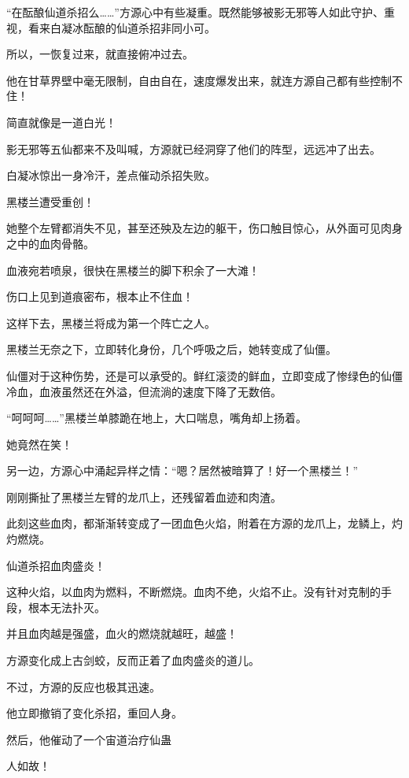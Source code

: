 \begin{this_body}
“在酝酿仙道杀招么……”方源心中有些凝重。既然能够被影无邪等人如此守护、重视，看来白凝冰酝酿的仙道杀招非同小可。

所以，一恢复过来，就直接俯冲过去。

他在甘草界壁中毫无限制，自由自在，速度爆发出来，就连方源自己都有些控制不住！

简直就像是一道白光！

影无邪等五仙都来不及叫喊，方源就已经洞穿了他们的阵型，远远冲了出去。

白凝冰惊出一身冷汗，差点催动杀招失败。

黑楼兰遭受重创！

她整个左臂都消失不见，甚至还殃及左边的躯干，伤口触目惊心，从外面可见肉身之中的血肉骨骼。

血液宛若喷泉，很快在黑楼兰的脚下积余了一大滩！

伤口上见到道痕密布，根本止不住血！

这样下去，黑楼兰将成为第一个阵亡之人。

黑楼兰无奈之下，立即转化身份，几个呼吸之后，她转变成了仙僵。

仙僵对于这种伤势，还是可以承受的。鲜红滚烫的鲜血，立即变成了惨绿色的仙僵冷血，血液虽然还在外溢，但流淌的速度下降了无数倍。

“呵呵呵……”黑楼兰单膝跪在地上，大口喘息，嘴角却上扬着。

她竟然在笑！

另一边，方源心中涌起异样之情：“嗯？居然被暗算了！好一个黑楼兰！”

刚刚撕扯了黑楼兰左臂的龙爪上，还残留着血迹和肉渣。

此刻这些血肉，都渐渐转变成了一团血色火焰，附着在方源的龙爪上，龙鳞上，灼灼燃烧。

仙道杀招血肉盛炎！

这种火焰，以血肉为燃料，不断燃烧。血肉不绝，火焰不止。没有针对克制的手段，根本无法扑灭。

并且血肉越是强盛，血火的燃烧就越旺，越盛！

方源变化成上古剑蛟，反而正着了血肉盛炎的道儿。

不过，方源的反应也极其迅速。

他立即撤销了变化杀招，重回人身。

然后，他催动了一个宙道治疗仙蛊

人如故！

\end{this_body}

